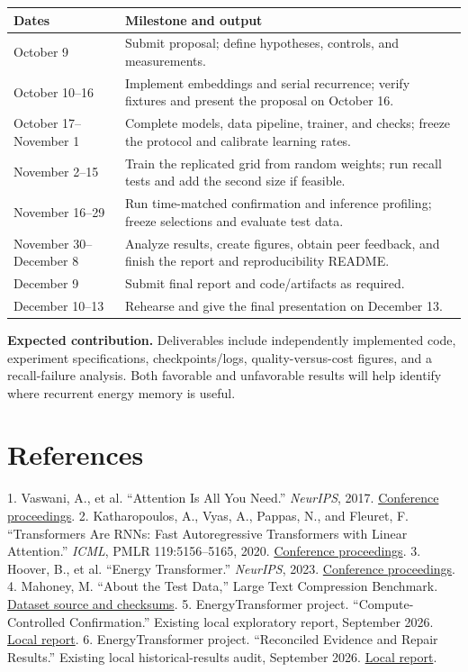 \documentclass[11pt,letterpaper]{article}
\begin{document}
\smallskip\begin{tabularx}{\textwidth}{@{}p{3.2cm}X@{}}\toprule
\textbf{Dates} & \textbf{Milestone and output}\\\midrule
October 9 & Submit proposal; define hypotheses, controls, and measurements.\\
October 10–16 & Implement embeddings and serial recurrence; verify fixtures and present the proposal on October 16.\\
October 17–November 1 & Complete models, data pipeline, trainer, and checks; freeze the protocol and calibrate learning rates.\\
November 2–15 & Train the replicated grid from random weights; run recall tests and add the second size if feasible.\\
November 16–29 & Run time-matched confirmation and inference profiling; freeze selections and evaluate test data.\\
November 30–December 8 & Analyze results, create figures, obtain peer feedback, and finish the report and reproducibility README.\\
December 9 & Submit final report and code/artifacts as required.\\
December 10–13 & Rehearse and give the final presentation on December 13.\\
\bottomrule\end{tabularx}\smallskip

\textbf{Expected contribution.} Deliverables include independently implemented code, experiment specifications, checkpoints/logs, quality-versus-cost figures, and a recall-failure analysis. Both favorable and unfavorable results will help identify where recurrent energy memory is useful.

\newpage
\section*{References}

1. Vaswani, A., et al. “Attention Is All You Need.” \emph{NeurIPS}, 2017. \href{https://proceedings.neurips.cc/paper/2017/hash/3f5ee243547dee91fbd053c1c4a845aa-Abstract.html}{Conference proceedings}.
2. Katharopoulos, A., Vyas, A., Pappas, N., and Fleuret, F. “Transformers Are RNNs: Fast Autoregressive Transformers with Linear Attention.” \emph{ICML}, PMLR 119:5156–5165, 2020. \href{https://proceedings.mlr.press/v119/katharopoulos20a.html}{Conference proceedings}.
3. Hoover, B., et al. “Energy Transformer.” \emph{NeurIPS}, 2023. \href{https://proceedings.neurips.cc/paper_files/paper/2023/hash/57a9b97477b67936298489e3c1417b0a-Abstract-Conference.html}{Conference proceedings}.
4. Mahoney, M. “About the Test Data,” Large Text Compression Benchmark. \href{https://mattmahoney.net/dc/textdata.html}{Dataset source and checksums}.
5. EnergyTransformer project. “Compute-Controlled Confirmation.” Existing local exploratory report, September 2026. \href{../reports/compute_confirmation/REPORT.md}{Local report}.
6. EnergyTransformer project. “Reconciled Evidence and Repair Results.” Existing local historical-results audit, September 2026. \href{../FINDINGS.md}{Local report}.
\end{document}

